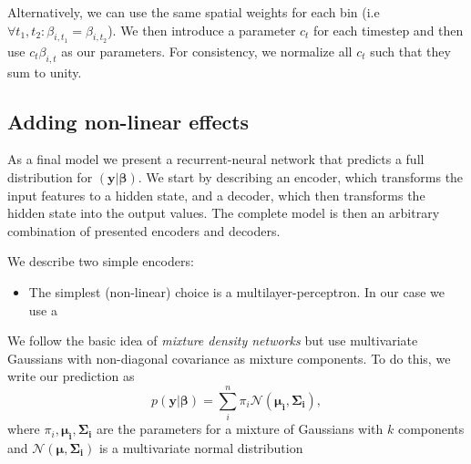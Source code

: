 \documentclass[nobib]{tufte-handout}
\begin{document}
Alternatively, we can use the same spatial weights for each bin (i.e\ \( \forall t_1, t_2: \beta_{i, t_1} = \beta_{i, t_2}\)).
We then introduce a parameter \(c_t\) for each timestep and then use $c_t \beta_{i,t}$ as our parameters.
For consistency, we normalize all \(c_t\) such that they sum to unity.

\subsection{Adding non-linear effects}
As a final model we present a recurrent-neural network that predicts a full distribution for \(\left( \bm{y} | \bm{\beta} \right)\).
We start by describing an encoder, which transforms the input features to a hidden state, and a decoder, which then transforms the hidden state into the output values.
The complete model is then an arbitrary combination of presented encoders and decoders.

We describe two simple encoders:
\begin{itemize}
\item The simplest (non-linear) choice is a multilayer-perceptron.
  In our case we use a 
\end{itemize}


We follow the basic idea of \textit{mixture density networks}\autocite{mdn} but use multivariate Gaussians with non-diagonal covariance as mixture components.
To do this, we write our prediction as
\begin{equation*}
p \left( \bm{y} | \bm{\beta} \right) = \sum_{i}^n \pi_i \mathcal{N} \left( \bm{\mu_i}, \bm{\Sigma_i} \right),
\end{equation*}
where \(\pi_i, \bm{\mu_i}, \bm{\Sigma_i}\) are the parameters for a mixture of Gaussians with \(k\) components and \(\mathcal{N}(\bm{\mu}, \bm{\Sigma_i})\) is a multivariate normal distribution 
\end{document}
